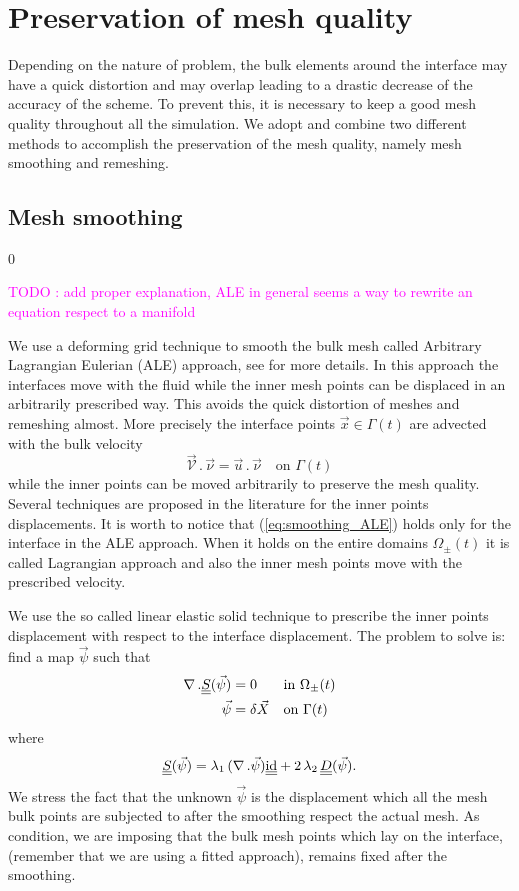 \documentclass[a4paper,12pt,onecolumn]{article}
\newcommand{\id}{\rm id}
\newcommand{\mat}[1]{\underline{\underline{#1}}\rule{0pt}{0pt}}
\begin{document}
\section{Preservation of mesh quality}

Depending on the nature of problem, the bulk elements around the interface may have a quick distortion and may overlap leading to a drastic decrease of the accuracy of the scheme. To prevent this, it is necessary to keep a good mesh quality throughout all the simulation. We adopt and combine two different methods to accomplish the preservation of the mesh quality, namely mesh smoothing and remeshing. 

\subsection{Mesh smoothing} \label{subsec:smoothing}
\setcounter{equation} 0

\textcolor{magenta}{TODO : add proper explanation, ALE in general seems a way to rewrite an equation respect to a manifold}

We use a deforming grid technique to smooth the bulk mesh called Arbitrary Lagrangian Eulerian (ALE) approach, see \cite{GanesanPhd} for more details. In this approach the interfaces move with the fluid while the inner mesh points can be displaced in an arbitrarily prescribed way. This avoids the quick distortion of meshes and remeshing almost. More precisely the interface points $\vec x \in \Gamma(t)$ are advected with the bulk velocity
\begin{equation}\label{eq:smoothing_ALE}
\vec{\mathcal{V}}\,.\,\vec\nu = \vec u\,.\,\vec \nu\quad \mbox{on }\Gamma(t)
\end{equation}
while the inner points can be moved arbitrarily to preserve the mesh quality. Several techniques are proposed in the literature for the inner points displacements. It is worth to notice that (\ref{eq:smoothing_ALE}) holds only for the interface in the ALE approach. When it holds on the entire domains $\Omega_{\pm}(t)$ it is called Lagrangian approach and also the inner mesh points move with the prescribed velocity.

We use the so called linear elastic solid technique to prescribe the inner points displacement with respect to the interface displacement. The problem to solve is: find a map $\vec \psi$ such that
\begin{align}
 \nabla\,.\mat S(\vec \psi) &= 0 && \mbox{in }\Omega_{\pm}(t)\\
 \vec \psi &= \delta \vec X && \mbox{on } \Gamma(t) 
\end{align}
where
\begin{equation} \label{eq:elasticity_tensor}
\mat S(\vec \psi) = \lambda_1 \,(\nabla\,.\vec\psi)\mat\id + 2\,\lambda_2\, \mat D(\vec\psi).
\end{equation}
We stress the fact that the unknown $\vec\psi$ is the displacement which all the mesh bulk points are subjected to after the smoothing respect the actual mesh. As condition, we are imposing that the bulk mesh points which lay on the interface, (remember that we are using a fitted approach), remains fixed after the smoothing.
\end{document}
